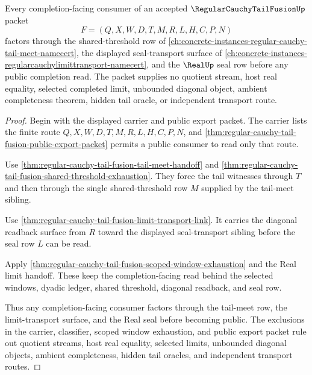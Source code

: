 \begin{theorem}
\label{thm:regular-cauchy-tail-fusion-bridged-consumer-packet}
Every completion-facing consumer of an accepted $\RegularCauchyTailFusionUp$ packet
$$
F=(Q,X,W,D,T,M,R,L,H,C,P,N)
$$
factors through the shared-threshold row of \autoref{ch:concrete-instances-regular-cauchy-tail-meet-namecert}, the displayed seal-transport surface of \autoref{ch:concrete-instances-regularcauchylimittransport-namecert}, and the $\RealUp$ seal row before any public completion read. The packet supplies no quotient stream, host real equality, selected completed limit, unbounded diagonal object, ambient completeness theorem, hidden tail oracle, or independent transport route.
\end{theorem}
\begin{proof}
Begin with the displayed carrier and public export packet. The carrier lists the finite route $Q,X,W,D,T,M,R,L,H,C,P,N$, and \autoref{thm:regular-cauchy-tail-fusion-public-export-packet} permits a public consumer to read only that route.

Use \autoref{thm:regular-cauchy-tail-fusion-tail-meet-handoff} and \autoref{thm:regular-cauchy-tail-fusion-shared-threshold-exhaustion}. They force the tail witnesses through $T$ and then through the single shared-threshold row $M$ supplied by the tail-meet sibling.

Use \autoref{thm:regular-cauchy-tail-fusion-limit-transport-link}. It carries the diagonal readback surface from $R$ toward the displayed seal-transport sibling before the seal row $L$ can be read.

Apply \autoref{thm:regular-cauchy-tail-fusion-scoped-window-exhaustion} and the Real limit handoff. These keep the completion-facing read behind the selected windows, dyadic ledger, shared threshold, diagonal readback, and seal row.

Thus any completion-facing consumer factors through the tail-meet row, the limit-transport surface, and the Real seal before becoming public. The exclusions in the carrier, classifier, scoped window exhaustion, and public export packet rule out quotient streams, host real equality, selected limits, unbounded diagonal objects, ambient completeness, hidden tail oracles, and independent transport routes.
\end{proof}

